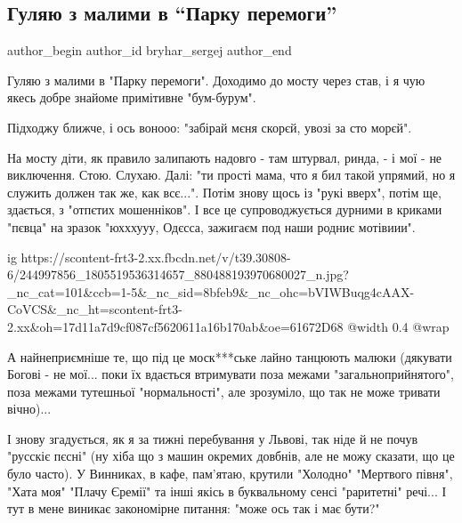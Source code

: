  
 
 
 
 
 
\subsection{Гуляю з малими в \enquote{Парку перемоги}}
\label{sec:08_10_2021.fb.bryhar_sergej.1.deti_progulka_mova_jazyk}
 
\ifcmt
 author_begin
   author_id bryhar_sergej
 author_end
\fi

Гуляю з малими в "Парку перемоги". Доходимо до мосту через став, і я чую якесь
добре знайоме примітивне "бум-бурум". 

Підходжу ближче, і ось вонооо: "забірай мєня скорєй, увозі за сто морєй". 

На мосту діти, як правило залипають надовго - там штурвал, ринда, - і мої - не
виключення. Стою. Слухаю. Далі: "ти прості мама, что я бил такой упрямий, но я
служить должен так же, как всє...". Потім знову щось із "рукі вверх", потім ще,
здається, з "отпєтих мошенніков". І все це супроводжується дурними в криками
"пєвца" на зразок "юхххууу, Одєсса, зажигаєм под наши родниє мотівиии".

\ifcmt
  ig https://scontent-frt3-2.xx.fbcdn.net/v/t39.30808-6/244997856_1805519536314657_880488193970680027_n.jpg?_nc_cat=101&ccb=1-5&_nc_sid=8bfeb9&_nc_ohc=bVIWBuqg4cAAX-CoVCS&_nc_ht=scontent-frt3-2.xx&oh=17d11a7d9cf087cf5620611a16b170ab&oe=61672D68
  @width 0.4
  @wrap 
\fi

А найнеприємніше те, що під це моск***ське лайно танцюють малюки (дякувати
Богові - не мої... поки їх вдається втримувати поза межами
"загальноприйнятого", поза межами тутешньої "нормальності", але зрозуміло, що
так не може тривати вічно)...

І знову згадується, як я за тижні перебування у Львові, так ніде й не почув
"русскіє пєсні" (ну хіба що з машин окремих довбнів, але не можу сказати, що це
було часто). У Винниках, в кафе, пам'ятаю, крутили "Холодно" "Мертвого півня",
"Хата моя" "Плачу Єремії" та інші якісь в буквальному сенсі "раритетні" речі...
І тут в мене виникає закономірне питання: "може ось так і має бути?"

